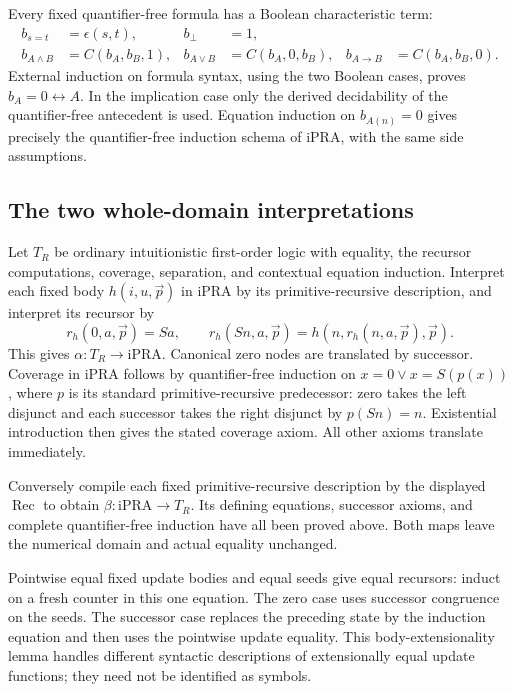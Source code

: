 \documentclass[10pt,letterpaper]{article}
\theoremstyle{definition}
\theoremstyle{remark}
\begin{document}
Every fixed quantifier-free formula has a Boolean characteristic term:
\[
\begin{aligned}
 b_{s=t}&=\epsilon(s,t),& b_\bot&=1,\\
 b_{A\land B}&=C(b_A,b_B,1),&
 b_{A\lor B}&=C(b_A,0,b_B),&
 b_{A\to B}&=C(b_A,b_B,0).
\end{aligned}
\]
External induction on formula syntax, using the two Boolean cases, proves
$b_A=0\leftrightarrow A$. In the implication case only the derived
decidability of the quantifier-free antecedent is used. Equation induction
on $b_{A(n)}=0$ gives precisely the quantifier-free induction schema of
iPRA, with the same side assumptions.

\subsection{The two whole-domain interpretations}

Let $T_R$ be ordinary intuitionistic first-order logic with equality,
the recursor computations, coverage, separation, and contextual equation
induction. Interpret each fixed body $h(i,u,\vec p)$ in iPRA by its
primitive-recursive description, and interpret its recursor by
\[
 r_h(0,a,\vec p)=Sa,\qquad
 r_h(Sn,a,\vec p)=h(n,r_h(n,a,\vec p),\vec p).
\]
This gives $\alpha:T_R\to\mathrm{iPRA}$. Canonical zero nodes are
translated by successor. Coverage in iPRA follows by quantifier-free
induction on $x=0\lor x=S(p(x))$, where $p$ is its standard
primitive-recursive predecessor: zero takes the left disjunct and each
successor takes the right disjunct by $p(Sn)=n$. Existential introduction
then gives the stated coverage axiom. All other axioms translate immediately.

Conversely compile each fixed primitive-recursive description by the
displayed $\operatorname{Rec}$ to obtain
$\beta:\mathrm{iPRA}\to T_R$. Its defining equations, successor axioms,
and complete quantifier-free induction have all been proved above.
Both maps leave the numerical domain and actual equality unchanged.

Pointwise equal fixed update bodies and equal seeds give equal recursors:
induct on a fresh counter in this one equation. The zero case uses
successor congruence on the seeds. The successor case replaces the preceding
state by the induction equation and then uses the pointwise update equality.
This body-extensionality lemma handles different syntactic descriptions of
extensionally equal update functions; they need not be identified as symbols.
\end{document}
